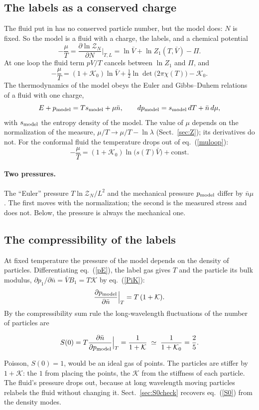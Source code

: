 \documentclass[11pt,aps,preprint,nofootinbib,superscriptaddress,tightenlines]{revtex4-2}
\def\st{\begin{equation}}
\def\stp{\end{equation}}
\def\Eq#1{eq.~(\ref{#1})}
\def\Sect#1{Sect.~\ref{#1}}
\let\oldparagraph\paragraph
\renewcommand{\paragraph}{\par\bigskip\oldparagraph}
\begin{document}
\subsection{The labels as a conserved charge}
\label{sec:charge}

The fluid put in has no conserved particle number, but the model does: $N$ is fixed.  So the model is a fluid with a charge, the labels, and a chemical
potential
\st
-\frac\mu T=\frac{\partial\ln\mathcal Z_N}{\partial N}\Big|_{T,L}=\ln\bar V+\ln Z_1(T,\bar V)-\Pi .
\label{mu}
\stp
At one loop the fluid term $pV/T$ cancels between $\ln Z_1$ and $\Pi$, and
\st
-\frac\mu T=(1+\mathcal K_0)\ln\bar V+\tfrac12\ln\det\big(2\pi\chi(T)\big)-\mathcal K_0 .
\label{muloop}
\stp
The thermodynamics of the model obeys the Euler and Gibbs--Duhem relations of a fluid with one charge,
\st
E+p_{\rm model}=Ts_{\rm model}+\mu\bar n,\qquad dp_{\rm model}=s_{\rm model}\,dT+\bar n\,d\mu ,
\label{GD}
\stp
with $s_{\rm model}$ the entropy density of the model.  The value of $\mu$ depends on the normalization of the measure, $\mu/T\to\mu/T-\ln\lambda$
(\Sect{sec:Z}); its derivatives do not.  For the conformal fluid the temperature drops out of \Eq{muloop}:
\st
-\frac\mu T=(1+\mathcal K_0)\ln\big(s(T)\bar V\big)+\text{const} .
\label{muconf}
\stp

\paragraph{Two pressures.}  The ``Euler'' pressure $T\ln\mathcal Z_N/L^2$ and the mechanical pressure $p_{\rm model}$ differ by $\bar n\mu$.  The first moves with
the normalization; the second is the measured stress and does not.  Below, the pressure is always the mechanical one.

\subsection{The compressibility of the labels}
\label{sec:S0}

At fixed temperature the pressure of the model depends on the density of particles.  Differentiating \Eq{pE}, the label gas gives $T$ and the particle its bulk modulus, $\partial p_1/\partial\bar n=\bar VB_1=T\mathcal K$ by \Eq{PiK}:
\st
\frac{\partial p_{\rm model}}{\partial\bar n}\Big|_T=T\,(1+\mathcal K) .
\stp
By the compressibility sum rule the long-wavelength fluctuations of the number of particles are
\begin{keyeq}
\st
S(0)=T\frac{\partial\bar n}{\partial p_{\rm model}}\Big|_T=\frac{1}{1+\mathcal K}\;\simeq\;\frac{1}{1+\mathcal K_0}=\frac25 .
\label{S0}
\stp
\end{keyeq}
Poisson, $S(0)=1$, would be an ideal gas of points.  The particles are stiffer by $1+\mathcal K$: the $1$ from placing the points, the $\mathcal K$ from the
stiffness of each particle.  The fluid's pressure drops out, because at long wavelength moving particles relabels the fluid without changing it.
\Sect{sec:S0check} recovers \Eq{S0} from the density modes.
\end{document}
